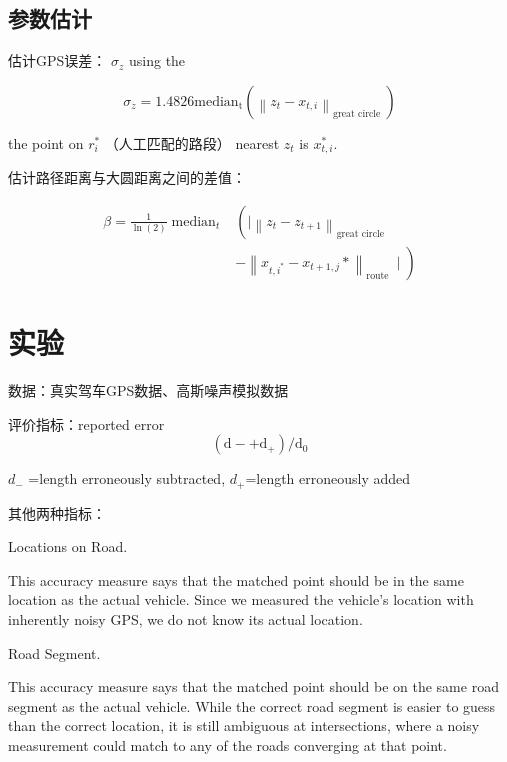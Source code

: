 \subsection{参数估计}

估计GPS误差：
$ \sigma_{z} $ using the 

$$ \sigma_{z}=1.4826 \mathrm{median}_{\mathrm{t}}\left(\left\|z_{t}-x_{t, i}\right\|_{\text {great circle }}\right) $$

the point on $ r_{i}^{*} $ （人工匹配的路段） nearest $ z_{t} $ is $ x_{t, i}^{*} $.

估计路径距离与大圆距离之间的差值：

$$ \begin{aligned} \beta=\frac{1}{\ln (2)} \operatorname{median}_{t} &\left(\mid\left\|z_{t}-z_{t+1}\right\|_{\text {great circle }}\right.\\ &\left.-\left\|x_{t, i^{*}}-x_{t+1, j} *\right\|_{\text {route }} \mid\right) \end{aligned} $$



\section{实验}

数据：真实驾车GPS数据、高斯噪声模拟数据

评价指标：reported error
  $$ \left(\mathrm{d}-+\mathrm{d}_{+}\right) / \mathrm{d}_{0} $$ 

  $d_{-}  $ =length erroneously subtracted,
  $ d_{+} $=length erroneously added



其他两种指标：

  Locations on Road. 
  \begin{remark}
      This accuracy measure
  says that the matched point should be in the
  same location as the actual vehicle. Since we
  measured the vehicle's location with inherently
  noisy GPS, we do not know its actual location.
  \end{remark}

  Road Segment.
  \begin{remark}
      This accuracy measure says
  that the matched point should be on the same
  road segment as the actual vehicle. While the
  correct road segment is easier to guess than the
  correct location, it is still ambiguous at
  intersections, where a noisy measurement could
  match to any of the roads converging at that
  point.
  \end{remark}
  
   